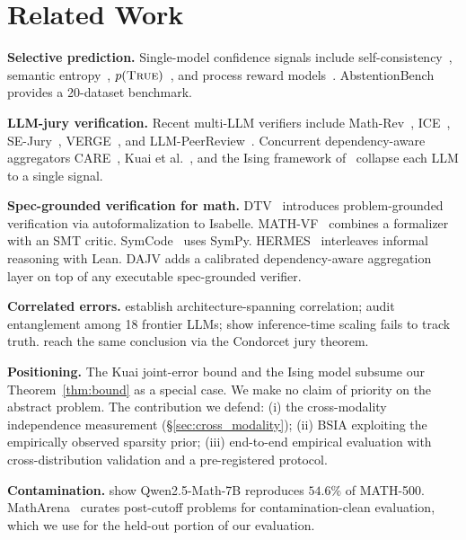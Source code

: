 \section{Related Work}
\label{sec:related}

\textbf{Selective prediction.}
Single-model confidence signals include
self-consistency~\citep{wang2023selfconsistency}, semantic
entropy~\citep{kuhn2023semantic,farquhar2024nature},
$p(\textsc{True})$~\citep{kadavath2022}, and process reward
models~\citep{lightman2024prm,qwenprm2025,skyworkprm2024}.
AbstentionBench~\citep{kirichenko2025abstentionbench} provides a
20-dataset benchmark.

\textbf{LLM-jury verification.}
Recent multi-LLM verifiers include
Math-Rev~\citep{liang2024mathrev}, ICE~\citep{omar2024ice},
SE-Jury~\citep{zhou2025sejury}, VERGE~\citep{singh2026verge}, and
LLM-PeerReview~\citep{chen2025peerreview}. Concurrent
dependency-aware aggregators
CARE~\citep{zhao2026care}, Kuai et al.~\citep{kuai2026independence},
and the Ising framework of~\citet{balasubramanian2026ising}
collapse each LLM to a single signal.

\textbf{Spec-grounded verification for math.}
DTV~\citep{dtv2024} introduces problem-grounded verification via
autoformalization to Isabelle. MATH-VF~\citep{kuoZhou2025mathvf}
combines a formalizer with an SMT critic.
SymCode~\citep{bagheriNezhad2025symcode} uses SymPy.
HERMES~\citep{ospanov2025hermes} interleaves informal reasoning
with Lean. DAJV adds a calibrated dependency-aware aggregation
layer on top of any executable spec-grounded verifier.

\textbf{Correlated errors.}
\citet{kim2025correlated} establish architecture-spanning
correlation; \citet{kuai2026independence} audit entanglement among
18 frontier LLMs; \citet{denisovblanch2026consensus} show
inference-time scaling fails to track truth.
\citet{lefort2024condorcet} reach the same conclusion via the
Condorcet jury theorem.

\textbf{Positioning.}
The Kuai joint-error bound and the
\citet{balasubramanian2026ising} Ising model subsume our
Theorem~\ref{thm:bound} as a special case. We make no claim of
priority on the abstract problem. The contribution we defend:
(i) the cross-modality independence measurement
(\S\ref{sec:cross_modality}); (ii) BSIA exploiting the empirically
observed sparsity prior; (iii) end-to-end empirical evaluation
with cross-distribution validation and a pre-registered protocol.

\textbf{Contamination.}
\citet{wu2025contam} show Qwen2.5-Math-7B reproduces $54.6\%$ of
MATH-500. MathArena~\citep{matharena2025} curates post-cutoff
problems for contamination-clean evaluation, which we use for the
held-out portion of our evaluation.
